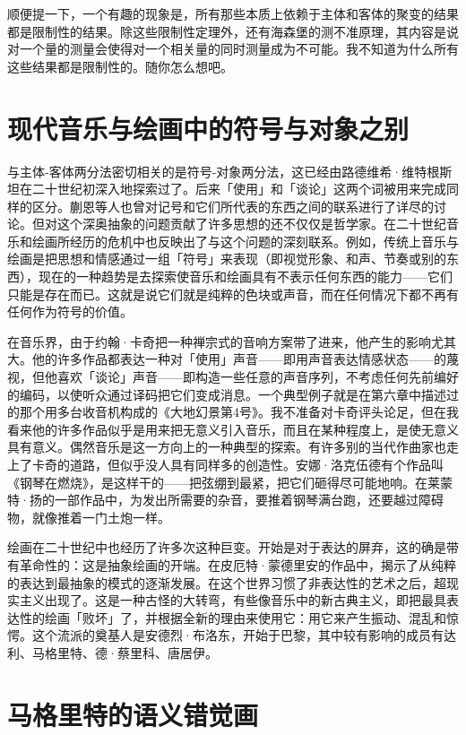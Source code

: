 \documentclass[
  12pt,
  twoside,
  openright,
  oldfontcommands,
]{memoir}
\begin{document}
顺便提一下，一个有趣的现象是，所有那些本质上依赖于主体和客体的聚变的结果都是限制性的结果。除这些限制性定理外，还有海森堡的测不准原理，其内容是说对一个量的测量会使得对一个相关量的同时测量成为不可能。我不知道为什么所有这些结果都是限制性的。随你怎么想吧。

\section{现代音乐与绘画中的符号与对象之别}

与主体-客体两分法密切相关的是符号-对象两分法，这已经由路德维希·维特根斯坦在二十世纪初深入地探索过了。后来「使用」和「谈论」这两个词被用来完成同样的区分。蒯恩等人也曾对记号和它们所代表的东西之间的联系进行了详尽的讨论。但对这个深奥抽象的问题贡献了许多思想的还不仅仅是哲学家。在二十世纪音乐和绘画所经历的危机中也反映出了与这个问题的深刻联系。例如，传统上音乐与绘画是把思想和情感通过一组「符号」来表现（即视觉形象、和声、节奏或别的东西），现在的一种趋势是去探索使音乐和绘画具有不表示任何东西的能力------它们只能是存在而已。这就是说它们就是纯粹的色块或声音，而在任何情况下都不再有任何作为符号的价值。

在音乐界，由于约翰·卡奇把一种禅宗式的音响方案带了进来，他产生的影响尤其大。他的许多作品都表达一种对「使用」声音------即用声音表达情感状态------的蔑视，但他喜欢「谈论」声音------即构造一些任意的声音序列，不考虑任何先前编好的编码，以使听众通过译码把它们变成消息。一个典型例子就是在第六章中描述过的那个用多台收音机构成的《大地幻景第4号》。我不准备对卡奇评头论足，但在我看来他的许多作品似乎是用来把无意义引入音乐，而且在某种程度上，是使无意义具有意义。偶然音乐是这一方向上的一种典型的探索。有许多别的当代作曲家也走上了卡奇的道路，但似乎没人具有同样多的创造性。安娜·洛克伍德有个作品叫《钢琴在燃烧》，是这样干的------把弦绷到最紧，把它们砸得尽可能地响。在莱蒙特·扬的一部作品中，为发出所需要的杂音，要推着钢琴满台跑，还要越过障碍物，就像推着一门土炮一样。

绘画在二十世纪中也经历了许多次这种巨变。开始是对于表达的屏弃，这的确是带有革命性的：这是抽象绘画的开端。在皮厄特·蒙德里安的作品中，揭示了从纯粹的表达到最抽象的模式的逐渐发展。在这个世界习惯了非表达性的艺术之后，超现实主义出现了。这是一种古怪的大转弯，有些像音乐中的新古典主义，即把最具表达性的绘画「败坏」了，并根据全新的理由来使用它：用它来产生振动、混乱和惊愕。这个流派的奠基人是安德烈·布洛东，开始于巴黎，其中较有影响的成员有达利、马格里特、德·蔡里科、唐居伊。

\section{马格里特的语义错觉画}
\end{document}

